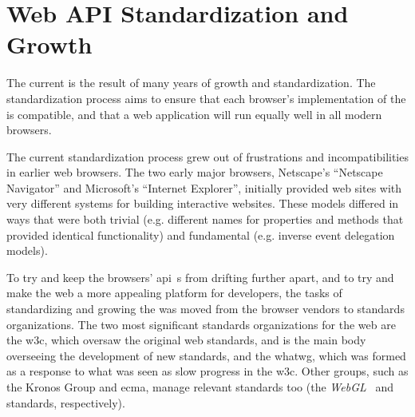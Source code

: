 \section{Web API Standardization and Growth}
\label{background:webapi-growth}

The current \WAPI is the result of many years of growth and standardization.
The standardization process aims to
ensure that each browser's implementation  of the \WAPI is compatible, and that
a web application will run equally well in all modern browsers.

The current standardization process grew out of frustrations and incompatibilities
in earlier web browsers.  The two early major browsers, Netscape's ``Netscape
Navigator'' and Microsoft's ``Internet Explorer'', initially provided web sites
with very different systems for building interactive websites.  These
models differed in ways that were both trivial
(e.g. different names for properties and methods that provided identical
functionality) and fundamental (e.g. inverse event delegation models).

To try and keep the browsers' \gls{api}~s from drifting further apart, and
to try and make the web a more appealing platform for developers,
the tasks of standardizing and growing the \WAPI was moved from the browser
vendors to standards organizations.  The two most significant standards
organizations for the web are the \gls{w3c}, which oversaw the original web
standards, and is the main body overseeing the development of new \WAPI
standards, and the \gls{whatwg}, which was formed as a response to what was seen
as slow progress in the \gls{w3c}.  Other groups, such as the Kronos Group and
\gls{ecma}, manage relevant standards too (the
\textit{WebGL}~\cite{webgl2015standard} and \textit{\JS}~\cite{ecmascript}
standards, respectively).
